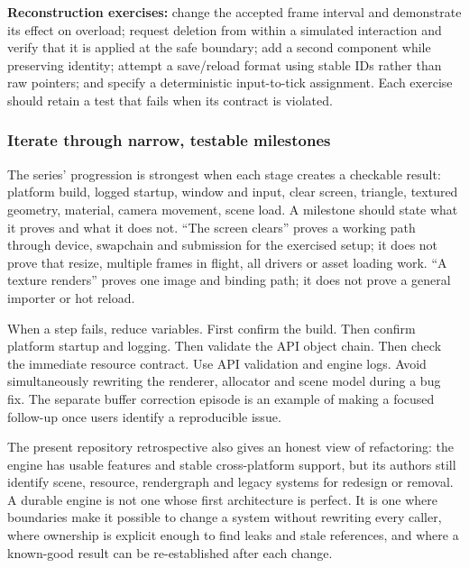 \textbf{Reconstruction exercises:} change the accepted frame interval and demonstrate its effect on overload; request deletion from within a simulated interaction and verify that it is applied at the safe boundary; add a second component while preserving identity; attempt a save/reload format using stable IDs rather than raw pointers; and specify a deterministic input-to-tick assignment. Each exercise should retain a test that fails when its contract is violated.

\subsubsection{Iterate through narrow, testable milestones}\label{06-engine-ii-ch042-iterate-through-narrow-testable-milestones}

\hypertarget{06-engine-ii-ch042-iterate-through-narrow-testable-milestones}{}

The series' progression is strongest when each stage creates a checkable result: platform build, logged startup, window and input, clear screen, triangle, textured geometry, material, camera movement, scene load. A milestone should state what it proves and what it does not. ``The screen clears'' proves a working path through device, swapchain and submission for the exercised setup; it does not prove that resize, multiple frames in flight, all drivers or asset loading work. ``A texture renders'' proves one image and binding path; it does not prove a general importer or hot reload.

When a step fails, reduce variables. First confirm the build. Then confirm platform startup and logging. Then validate the API object chain. Then check the immediate resource contract. Use API validation and engine logs. Avoid simultaneously rewriting the renderer, allocator and scene model during a bug fix. The separate buffer correction episode is an example of making a focused follow-up once users identify a reproducible issue.

The present repository retrospective also gives an honest view of refactoring: the engine has usable features and stable cross-platform support, but its authors still identify scene, resource, rendergraph and legacy systems for redesign or removal. A durable engine is not one whose first architecture is perfect. It is one where boundaries make it possible to change a system without rewriting every caller, where ownership is explicit enough to find leaks and stale references, and where a known-good result can be re-established after each change.

